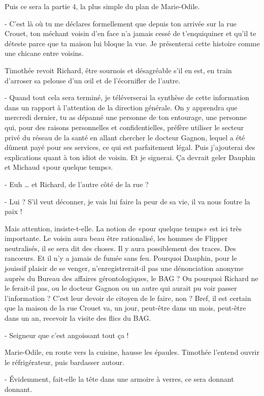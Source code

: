 Puis ce sera la partie 4, la plus simple du plan de Marie-Odile.

- C’est là où tu me déclares formellement que depuis ton arrivée sur la rue Crouet, ton méchant voisin d’en face n’a jamais cessé de t’enquiquiner et qu’il te déteste parce que ta maison lui bloque la vue. Je présenterai cette histoire comme une chicane entre voisins.

Timothée revoit Richard, être sournois et désagréable s’il en est, en train d’arroser sa pelouse d’un œil et de l’écornifler de l’autre.

- Quand tout cela sera terminé, je téléverserai la synthèse de cette information dans un rapport à l’attention de la direction générale. On y apprendra que mercredi dernier, tu as dépanné une personne de ton entourage, une personne qui, pour des raisons personnelles et confidentielles, préfère utiliser le secteur privé du réseau de la santé en allant chercher le docteur Gagnon, lequel a été dûment payé pour ses services, ce qui est parfaitement légal. Puis j’ajouterai des explications quant à ton idiot de voisin. Et je signerai. Ça devrait geler Dauphin et Michaud «pour quelque temps».

- Euh … et Richard, de l’autre côté de la rue ?

- Lui ? S’il veut déconner, je vais lui faire la peur de sa vie, il va nous foutre la paix !

Mais attention, insiste-t-elle. La notion de «pour quelque temps» est ici très importante. Le voisin aura beau être rationalisé, les hommes de Flipper neutralisés, il se sera dit des choses. Il y aura possiblement des traces. Des rancœurs. Et il n’y a jamais de fumée sans feu. Pourquoi Dauphin, pour le jouissif plaisir de se venger, n’enregistrerait-il pas une dénonciation anonyme auprès du Bureau des affaires gérontologiques, le BAG ? Ou pourquoi Richard ne le ferait-il pas, ou le docteur Gagnon ou un autre qui aurait pu voir passer l’information ? C’est leur devoir de citoyen de le faire, non ? Bref, il est certain que la maison de la rue Crouet va, un jour, peut-être dans un mois, peut-être dans un an, recevoir la visite des flics du BAG.

- Seigneur que c’est angoissant tout ça !

Marie-Odile, en route vers la cuisine, hausse les épaules. Timothée l’entend ouvrir le réfrigérateur, puis bardasser autour.

- Évidemment, fait-elle la tête dans une armoire à verres, ce sera donnant donnant.

